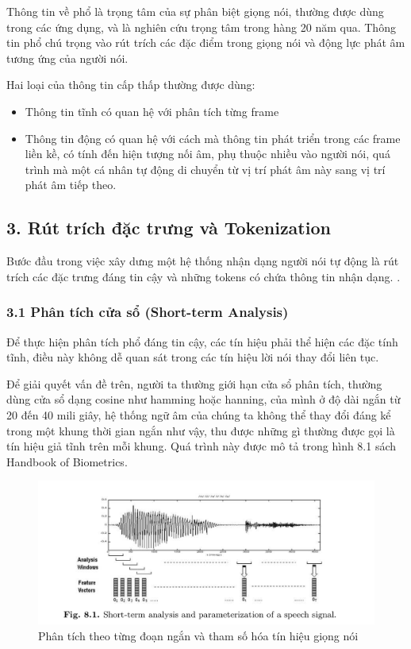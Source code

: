 \documentclass{article}
\begin{document}
	 Thông tin về phổ là trọng tâm của sự phân biệt giọng nói, thường được dùng trong các ứng dụng, và là nghiên cứu trọng tâm trong hàng 20 năm qua. Thông tin phổ chú trọng vào rút trích các đặc điểm trong giọng nói và động lực phát âm tương ứng của người nói. 
	 
	 Hai loại của thông tin cấp thấp thường được dùng:
	 \begin{itemize}
	 	\item Thông tin tĩnh có quan hệ với phân tích từng frame
	 	\item Thông tin động có quan hệ với cách mà thông tin phát triển trong các frame liền kề, có tính đến hiện tượng nối âm, phụ thuộc nhiều vào người nói, quá trình mà một cá nhân tự động di chuyển từ vị trí phát âm này sang vị trí phát âm tiếp theo.
	 \end{itemize}
	
	\subsection{3. Rút trích đặc trưng và Tokenization}
	\qquad Bước đầu trong việc xây dưng một hệ thống nhận dạng người nói tự động là rút trích các đặc trưng đáng tin cậy và những tokens có chứa thông tin nhận dạng. .
	
	\subsubsection{3.1 Phân tích cửa sổ (Short-term Analysis)}
	\qquad Để thực hiện phân tích phổ đáng tin cậy, các tín hiệu phải thể hiện các đặc tính tĩnh, điều này không dễ quan sát trong các tín hiệu lời nói thay đổi liên tục. 
	
	Để giải quyết vấn đề trên, người ta thường giới hạn cửa sổ phân tích, thường dùng cửa sổ dạng cosine như hamming hoặc hanning, của mình ở độ dài ngắn từ 20 đến 40 mili giây, hệ thống ngữ âm của chúng ta không thể thay đổi đáng kể trong một khung thời gian ngắn như vậy, thu được những gì thường được gọi là tín hiệu giả tĩnh trên mỗi khung. Quá trình này được mô tả trong hình 8.1 sách Handbook of Biometrics.
	
	\begin{figure}[H]
		\centering
		\includegraphics[width=1\linewidth]{images/figure_8_1.png}
		\caption{Phân tích theo từng đoạn ngắn và tham số hóa tín hiệu giọng nói}
		\label{fig:writing-thesis}
	\end{figure}
\end{document}
